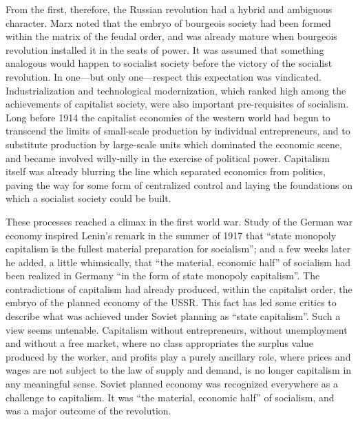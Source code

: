 From the first, therefore, the Russian revolution had a hybrid and ambiguous character. Marx noted that the embryo of bourgeois society had been formed within the matrix of the feudal order, and was already mature when bourgeois revolution installed it in the seats of power. It was assumed that something analogous would happen to socialist society before the victory of the socialist revolution. In one---but only one---respect this expectation was vindicated. Industrialization and technological modernization, which ranked high among the achievements of capitalist society, were also important pre-requisites of socialism. Long before 1914 the capitalist economies of the western world had begun to transcend the limits of small-scale production by individual entrepreneurs, and to substitute production by large-scale units which dominated the economic scene, and became involved willy-nilly in the exercise of political power. Capitalism itself was already blurring the line which separated economics from politics, paving the way for some form of centralized control and laying the foundations on which a socialist society could be built. 

These processes reached a climax in the first world war. Study of the German war economy inspired Lenin's remark in the summer of 1917 that ``state monopoly capitalism is the fullest material preparation for socialism''; and a few weeks later he added, a little whimsically, that ``the material, economic half'' of socialism had been realized in Germany ``in the form of state monopoly capitalism''. The contradictions of capitalism had already produced, within the capitalist order, the embryo of the planned economy of the USSR. This fact has led some critics to describe what was achieved under Soviet planning as ``state capitalism''. Such a view seems untenable. Capitalism without entrepreneurs, without unemployment and without a free market, where no class appropriates the surplus value produced by the worker, and profits play a purely ancillary role, where prices and wages are not subject to the law of supply and demand, is no longer capitalism in any meaningful sense. Soviet planned economy was recognized everywhere as a challenge to capitalism. It was ``the material, economic half'' of socialism, and was a major outcome of the revolution. 


